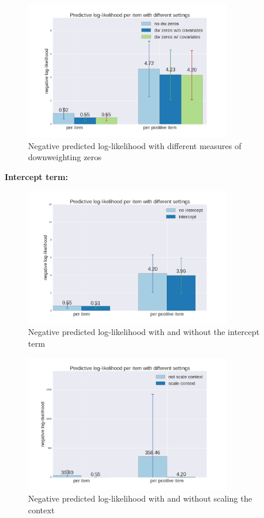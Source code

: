 \documentclass{article}
\begin{document}
\begin{figure}[t]
    \centering
    \includegraphics[width=0.8\textwidth]{figures/dwz.png}
    \caption{Negative predicted log-likelihood with different measures of downweighting zeros}
    \label{fig_dimensionality}
\end{figure}




{\bf Intercept term: }


\begin{figure}[t]
    \centering
    \includegraphics[width=0.8\textwidth]{figures/intercept_term.png}
    \caption{Negative predicted log-likelihood with and without the intercept term}
    \label{fig_intercept_term}
\end{figure}



\begin{figure}[t]
    \centering
    \includegraphics[width=0.8\textwidth]{figures/scale_context.png}
    \caption{Negative predicted log-likelihood with and without scaling the context}
    \label{fig_dimensionality}
\end{figure}
\end{document}
